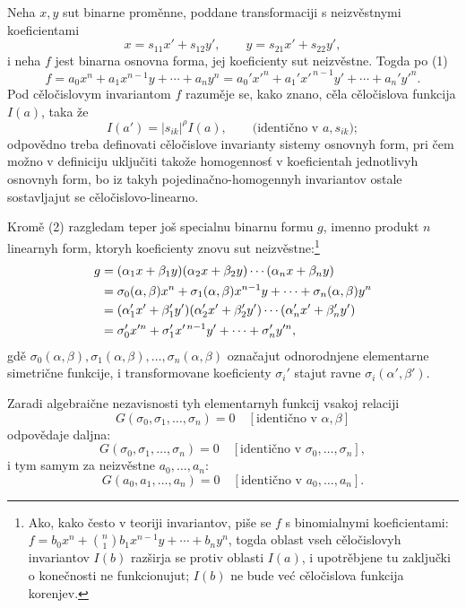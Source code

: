 \documentclass[11pt]{article}
\begin{document}
Neha \(x,y\) sut binarne proměnne, poddane transformaciji s neizvěstnymi koeficientami
\begin{equation}
        x=s_{11}x'+s_{12}y',\qquad y=s_{21}x'+s_{22}y',
\end{equation}
i neha \(f\) jest binarna osnovna forma, jej koeficienty sut neizvěstne. Togda po (1)
\begin{equation}
        f=a_0x^n+a_1x^{n-1}y+\cdots+a_ny^n
        =a_0'x'^n+a_1'x'^{\,n-1}y'+\cdots+a_n'y'^n.
\end{equation}
Pod cěločislovym invariantom \(f\) razuměje se, kako znano, cěla cěločislova funkcija \(I(a)\), taka že
\begin{equation}
        I(a')=|s_{ik}|^\rho I(a),\qquad \text{(identično v \(a,s_{ik}\))};
\end{equation}
odpovědno treba definovati cěločislove invarianty sistemy osnovnyh form, pri čem možno v definiciju uključiti takože homogennosť v koeficientah jednotlivyh osnovnyh form, bo iz takyh pojedinačno-homogennyh invariantov ostale sostavljajut se cěločislovo-linearno.

Kromě (2) razgledam teper još specialnu binarnu formu \(g\), imenno produkt \(n\) linearnyh form, ktoryh koeficienty znovu sut neizvěstne:\footnote{Ako, kako često v teoriji invariantov, piše se \(f\) s binomialnymi koeficientami: \(f=b_0x^n+\binom n1b_1x^{n-1}y+\cdots+b_ny^n\), togda oblast vseh cěločislovyh invariantov \(I(b)\) razširja se protiv oblasti \(I(a)\), i upotrěbjene tu zaključki o konečnosti ne funkcionujut; \(I(b)\) ne bude već cěločislova funkcija korenjev.}
\begin{align}
        g&=(\alpha_1x+\beta_1y)(\alpha_2x+\beta_2y)\cdots(\alpha_nx+\beta_ny)\notag\\
         &=\sigma_0(\alpha,\beta)x^n+\sigma_1(\alpha,\beta)x^{n-1}y+\cdots+\sigma_n(\alpha,\beta)y^n\notag\\
         &=(\alpha_1'x'+\beta_1'y')(\alpha_2'x'+\beta_2'y')\cdots(\alpha_n'x'+\beta_n'y')\notag\\
         &=\sigma_0'x'^n+\sigma_1'x'^{\,n-1}y'+\cdots+\sigma_n'y'^n,
\end{align}
gdě \(\sigma_0(\alpha,\beta),\sigma_1(\alpha,\beta),\ldots,\sigma_n(\alpha,\beta)\) označajut odnorodnjene elementarne simetrične funkcije, i transformovane koeficienty \(\sigma_i'\) stajut ravne \(\sigma_i(\alpha',\beta')\).

Zaradi algebraične nezavisnosti tyh elementarnyh funkcij vsakoj relaciji
\begin{equation}
        G(\sigma_0,\sigma_1,\ldots,\sigma_n)=0
        \quad [\text{identično v \(\alpha,\beta\)}]
\end{equation}
odpovědaje daljna:
\begin{equation}
        G(\sigma_0,\sigma_1,\ldots,\sigma_n)=0
        \quad [\text{identično v \(\sigma_0,\ldots,\sigma_n\)}],
\end{equation}
i tym samym za neizvěstne \(a_0,\ldots,a_n\):
\begin{equation}
        G(a_0,a_1,\ldots,a_n)=0
        \quad [\text{identično v \(a_0,\ldots,a_n\)}].
\end{equation}
\end{document}
